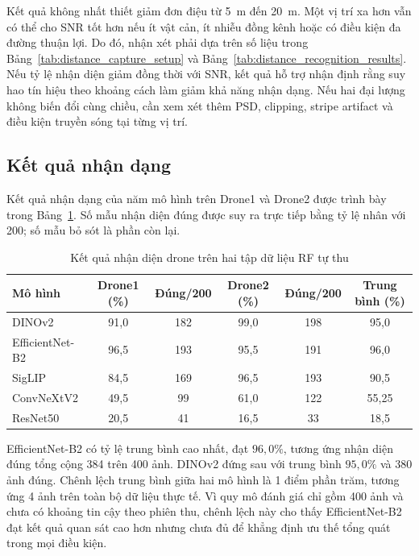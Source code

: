 \documentclass[../DoAn.tex]{subfiles}
\begin{document}
Kết quả không nhất thiết giảm đơn điệu từ 5~m đến 20~m. Một vị trí xa hơn vẫn có thể cho SNR tốt hơn nếu ít vật cản, ít nhiễu đồng kênh hoặc có điều kiện đa đường thuận lợi. Do đó, nhận xét phải dựa trên số liệu trong Bảng~\ref{tab:distance_capture_setup} và Bảng~\ref{tab:distance_recognition_results}. Nếu tỷ lệ nhận diện giảm đồng thời với SNR, kết quả hỗ trợ nhận định rằng suy hao tín hiệu theo khoảng cách làm giảm khả năng nhận dạng. Nếu hai đại lượng không biến đổi cùng chiều, cần xem xét thêm PSD, clipping, stripe artifact và điều kiện truyền sóng tại từng vị trí.

\subsection{Kết quả nhận dạng}

Kết quả nhận dạng của năm mô hình trên Drone1 và Drone2 được trình bày trong Bảng~\ref{tab:real_recognition_results}. Số mẫu nhận diện đúng được suy ra trực tiếp bằng tỷ lệ nhân với 200; số mẫu bỏ sót là phần còn lại.

\begin{table}[H]
    \centering
    \caption{Kết quả nhận diện drone trên hai tập dữ liệu RF tự thu}
    \label{tab:real_recognition_results}
    \renewcommand{\arraystretch}{1.3}
    \begin{tabular}{|p{}|c|c|c|c|c|}
        \hline
        \textbf{Mô hình} & \textbf{Drone1 (\%)} & \textbf{Đúng/200} & \textbf{Drone2 (\%)} & \textbf{Đúng/200} & \textbf{Trung bình (\%)} \\ \hline
        DINOv2 & 91,0 & 182 & 99,0 & 198 & 95,0 \\ \hline
        EfficientNet-B2 & 96,5 & 193 & 95,5 & 191 & 96,0 \\ \hline
        SigLIP & 84,5 & 169 & 96,5 & 193 & 90,5 \\ \hline
        ConvNeXtV2 & 49,5 & 99 & 61,0 & 122 & 55,25 \\ \hline
        ResNet50 & 20,5 & 41 & 16,5 & 33 & 18,5 \\ \hline
    \end{tabular}
\end{table}

EfficientNet-B2 có tỷ lệ trung bình cao nhất, đạt $96,0\%$, tương ứng nhận diện đúng tổng cộng 384 trên 400 ảnh. DINOv2 đứng sau với trung bình $95,0\%$ và 380 ảnh đúng. Chênh lệch trung bình giữa hai mô hình là 1 điểm phần trăm, tương ứng 4 ảnh trên toàn bộ dữ liệu thực tế. Vì quy mô đánh giá chỉ gồm 400 ảnh và chưa có khoảng tin cậy theo phiên thu, chênh lệch này cho thấy EfficientNet-B2 đạt kết quả quan sát cao hơn nhưng chưa đủ để khẳng định ưu thế tổng quát trong mọi điều kiện.
\end{document}
